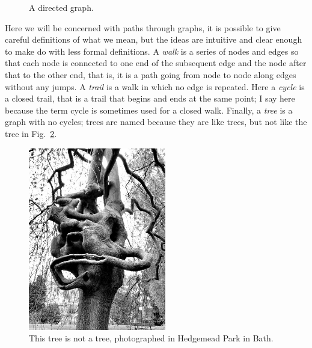 \documentclass[11pt,a4paper]{scrartcl}
\begin{document}
\begin{figure}
\begin{center}
\end{center}
\caption{A directed graph. \label{fig:dir_graph}}
\end{figure}

Here we will be concerned with paths through graphs, it is possible to
give careful definitions of what we mean, but the ideas are intuitive
and clear enough to make do with less formal definitions. A
\textsl{walk} is a series of nodes and edges so that each node is
connected to one end of the subsequent edge and the node after that to
the other end, that is, it is a path going from node to node along
edges without any jumps. A \textsl{trail} is a walk in which no edge
is repeated. Here a \textsl{cycle} is a closed trail, that is a trail
that begins and ends at the same point; I say here because the term
cycle is sometimes used for a closed walk. Finally, a \textsl{tree} is
a graph with no cycles; trees are named because they are like trees, but not like the tree in Fig.~\ref{fig:not_a_tree}.

\begin{figure}
\begin{center}
\includegraphics[width=6cm]{not_a_tree_bw.jpg}
\end{center}
\caption{This tree is not a tree, photographed in Hedgemead Park in Bath.\label{fig:not_a_tree}}
\end{figure}
\end{document}
